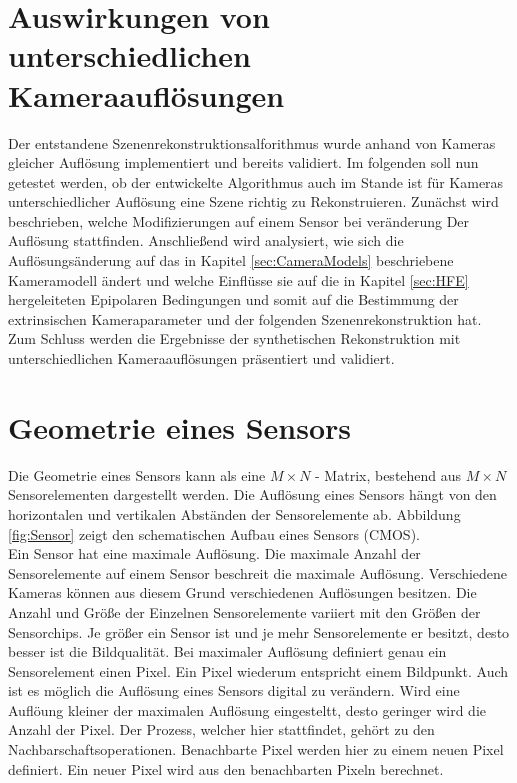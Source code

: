 \section{Auswirkungen von unterschiedlichen Kameraauflösungen}
\label{sec:minimalAuf} 

Der entstandene Szenenrekonstruktionsalforithmus wurde anhand von Kameras gleicher Auflösung implementiert und bereits validiert. Im folgenden soll nun getestet werden, ob der entwickelte Algorithmus auch im Stande ist für Kameras unterschiedlicher Auflösung eine Szene richtig zu Rekonstruieren. Zunächst wird beschrieben, welche Modifizierungen auf einem Sensor bei veränderung Der Auflösung stattfinden. Anschließend wird analysiert, wie sich die Auflösungsänderung auf das in Kapitel \ref{sec:CameraModels} beschriebene Kameramodell ändert und welche Einflüsse sie auf die in Kapitel \ref{sec:HFE} hergeleiteten Epipolaren Bedingungen und somit auf die Bestimmung der extrinsischen Kameraparameter und der folgenden Szenenrekonstruktion hat. Zum Schluss werden die Ergebnisse der synthetischen Rekonstruktion mit unterschiedlichen Kameraauflösungen präsentiert und validiert.
 

\section{Geometrie eines Sensors}


Die Geometrie eines Sensors kann als eine  $M \times N$ - Matrix, bestehend aus $M \times N$ Sensorelementen dargestellt werden\cite{Photonik}. Die Auflösung eines Sensors hängt von den horizontalen und vertikalen Abständen der Sensorelemente ab. Abbildung \ref{fig:Sensor} zeigt den schematischen Aufbau eines Sensors (CMOS). \\


Ein Sensor hat eine maximale Auflösung. Die maximale Anzahl der Sensorelemente auf einem Sensor beschreit die maximale Auflösung. Verschiedene Kameras können aus diesem Grund verschiedenen Auflösungen besitzen. Die Anzahl und Größe der Einzelnen Sensorelemente variiert mit den Größen der Sensorchips. Je größer ein Sensor ist und je mehr Sensorelemente er besitzt, desto besser ist die Bildqualität\cite{Photonik}. Bei maximaler Auflösung definiert genau ein Sensorelement einen Pixel. Ein Pixel wiederum entspricht einem Bildpunkt\cite{Photonik}. Auch ist es möglich die Auflösung eines Sensors digital zu verändern. Wird eine Auflöung kleiner der maximalen Auflösung eingesteltt, desto geringer wird die Anzahl der Pixel. Der Prozess, welcher hier stattfindet, gehört zu den Nachbarschaftsoperationen. Benachbarte Pixel werden hier zu einem neuen Pixel definiert\cite{Photonik}. Ein neuer Pixel wird aus den benachbarten Pixeln berechnet.\\


